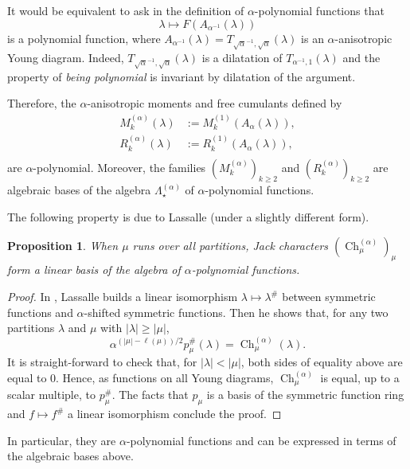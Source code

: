 \documentclass[11pt]{amsart}
\theoremstyle{plain}
\newtheorem{proposition}[lemma]{Proposition}
\theoremstyle{remark}
\newcommand{\Pola}{\Lambda_\star^{(\alpha)}}
\DeclareMathOperator{\Ch}{Ch}
\begin{document}
It would be equivalent to ask in the definition of $\alpha$-polynomial functions that
\[\lambda \mapsto F (A_{\alpha^{-1}}(\lambda) ) \]
is a polynomial function, 
where $A_{\alpha^{-1}}(\lambda) = T_{\sqrt{\alpha}^{-1},\sqrt{\alpha}}(\lambda)$
is an $\alpha$-anisotropic Young diagram.
Indeed, $T_{\sqrt{\alpha}^{-1},\sqrt{\alpha}}(\lambda)$ is a dilatation of
$T_{\alpha^{-1},1}(\lambda)$ and the property of {\em being polynomial} is invariant
by dilatation of the argument.

Therefore, the $\alpha$-anisotropic moments and free cumulants defined by
\begin{align*}
    M_k^{(\alpha)}(\lambda)&:= M^{(1)}_k \left( A_{\alpha}(\lambda) \right),\\
    R_k^{(\alpha)}(\lambda) &:= R^{(1)}_k \left( A_{\alpha}(\lambda) \right), \\
\end{align*}
are $\alpha$-polynomial.
Moreover, the families $(M_k^{(\alpha)})_{k\geq 2}$ and $(R_k^{(\alpha)})_{k\geq 2}$ are algebraic bases of the algebra $\Pola$ of
$\alpha$-polynomial functions.

The following property is due to Lassalle (under a slightly different form).
\begin{proposition}\label{prop:Jack-characters-basis}
When $\mu$ runs over all partitions,
 Jack characters $\left(\Ch^{(\alpha)}_\mu\right)_\mu$ form a linear basis of
the algebra of $\alpha$-polynomial functions.
\end{proposition}
\begin{proof}
    In \cite[Section 3]{Lassalle2008a}, Lassalle builds a
    linear isomorphism
    $\lambda \mapsto \lambda^\#$ between symmetric functions and 
    $\alpha$-shifted symmetric functions.
    Then he shows \cite[Proposition 2]{Lassalle2008a} that,
    for any two partitions $\lambda$ and $\mu$ with $|\lambda| \ge |\mu|$,
    \[\alpha^{(|\mu|-\ell(\mu))/2}  p_\mu^\#(\lambda) = \Ch^{(\alpha)}_\mu(\lambda).\]
    It is straight-forward to check that, for $|\lambda| < |\mu|$,
    both sides of equality above are equal to $0$.
    Hence, as functions on all Young diagrams,
    $\Ch^{(\alpha)}_\mu$ is equal, up to a scalar multiple, to $p_\mu^\#$.
    The facts that $p_\mu$ is a basis of the symmetric function ring and
    $f\mapsto f^\#$ a linear isomorphism conclude the proof.
\end{proof}
In particular, they are $\alpha$-polynomial functions and can be expressed in
terms of the algebraic bases above.
\end{document}
